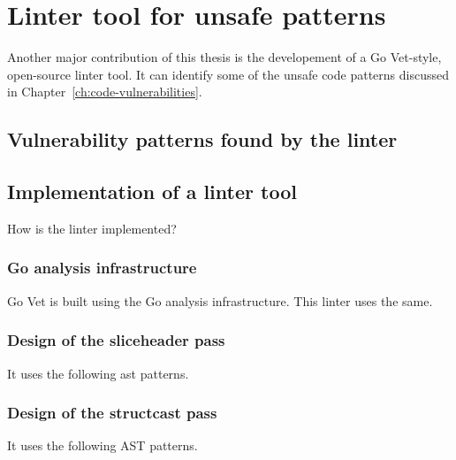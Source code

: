 
\chapter{Linter tool for unsafe patterns}\label{ch:go-safer}

Another major contribution of this thesis is the developement of a Go Vet-style, open-source linter tool. It can
identify some of the unsafe code patterns discussed in Chapter~\ref{ch:code-vulnerabilities}.



\section{Vulnerability patterns found by the linter}\label{sec:go-safer-scope}



\section{Implementation of a linter tool}\label{sec:go-safer-implementation}

How is the linter implemented?


\subsection{Go analysis infrastructure}\label{subsec:go-safer-analysis-infrastucture}

Go Vet is built using the Go analysis infrastructure. This linter uses the same.


\subsection{Design of the sliceheader pass}\label{subsec:go-safer-passes-sliceheader}

It uses the following \acrshort{ast} patterns.


\subsection{Design of the structcast pass}\label{subsec:go-safer-passes-structcast}

It uses the following AST patterns.


